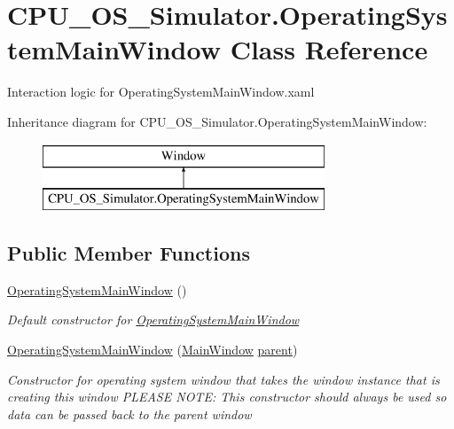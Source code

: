 \hypertarget{class_c_p_u___o_s___simulator_1_1_operating_system_main_window}{}\section{C\+P\+U\+\_\+\+O\+S\+\_\+\+Simulator.\+Operating\+System\+Main\+Window Class Reference}
\label{class_c_p_u___o_s___simulator_1_1_operating_system_main_window}


Interaction logic for Operating\+System\+Main\+Window.\+xaml  


Inheritance diagram for C\+P\+U\+\_\+\+O\+S\+\_\+\+Simulator.\+Operating\+System\+Main\+Window\+:\begin{figure}[H]
\begin{center}
\leavevmode
\includegraphics[height=2.000000cm]{class_c_p_u___o_s___simulator_1_1_operating_system_main_window}
\end{center}
\end{figure}
\subsection*{Public Member Functions}
\begin{DoxyCompactItemize}
\item 
\hyperlink{class_c_p_u___o_s___simulator_1_1_operating_system_main_window_a6ebb63e5bf2709cb0281434c651845dc}{Operating\+System\+Main\+Window} ()
\begin{DoxyCompactList}\small\item\em Default constructor for \hyperlink{class_c_p_u___o_s___simulator_1_1_operating_system_main_window}{Operating\+System\+Main\+Window} \end{DoxyCompactList}\item 
\hyperlink{class_c_p_u___o_s___simulator_1_1_operating_system_main_window_a2e4a26004957e2b1f1c4376f0a6656ab}{Operating\+System\+Main\+Window} (\hyperlink{class_c_p_u___o_s___simulator_1_1_main_window}{Main\+Window} \hyperlink{class_c_p_u___o_s___simulator_1_1_operating_system_main_window_a0219ba1583d00852bea36ac27c9d878d}{parent})
\begin{DoxyCompactList}\small\item\em Constructor for operating system window that takes the window instance that is creating this window P\+L\+E\+A\+S\+E N\+O\+T\+E\+: This constructor should always be used so data can be passed back to the parent window \end{DoxyCompactList}\end{DoxyCompactItemize}
